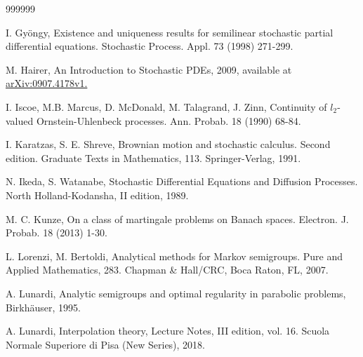 \documentclass[preprint]{imsart}
\begin{document}
\begin{thebibliography}  {999999}
{ I. Gy\"ongy,  Existence and uniqueness results for semilinear stochastic partial differential equations. Stochastic Process. Appl. 73 (1998) 271-299.  
 

 

 M. Hairer, An Introduction to Stochastic PDEs,  2009,  available at \url{arXiv:0907.4178v1.}  
 
 
 I.  Iscoe, M.B. Marcus, D. McDonald,  M. Talagrand, J.  Zinn,  Continuity of $l_2$-valued Ornstein-Uhlenbeck processes.
Ann. Probab. 18 (1990)  68-84.   
 

 I. Karatzas, S. E.
 Shreve,  Brownian motion and stochastic calculus. Second
edition. Graduate Texts in Mathematics, 113. Springer-Verlag,
  1991. 

  
  
N.  Ikeda, S. Watanabe, Stochastic Differential Equations
and Diffusion Processes. North Holland-Kodansha, II edition, 1989.

  



  M. C. Kunze, On a class of martingale problems on Banach spaces. Electron. J. Probab. 18  (2013) 1-30.
 
 
  {  L. Lorenzi, M. Bertoldi,  Analytical methods for Markov semigroups. Pure and Applied Mathematics, 283. Chapman \& Hall/CRC, Boca Raton, FL, 2007.}
 
 
  {   A. Lunardi,  Analytic semigroups and optimal regularity in parabolic problems, Birkh\"auser, 1995. }
 
 
 {  A. Lunardi,  Interpolation theory,  Lecture Notes, III edition, vol. 16. Scuola Normale Superiore di Pisa (New Series), 2018. 
 }
 
}
\end{thebibliography}
\end{document}
